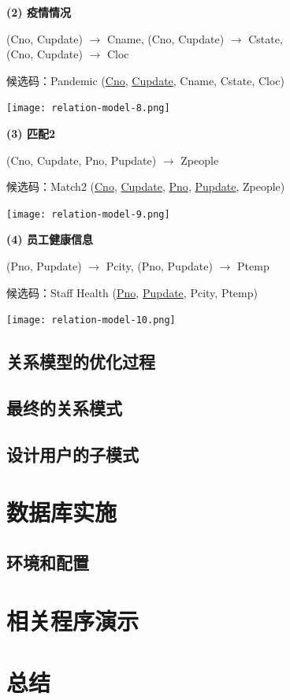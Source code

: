 \documentclass[12pt]{article}
\begin{document}
\noindent \textbf{(2) 疫情情况} \par 
(Cno, Cupdate) $\rightarrow$ Cname, (Cno, Cupdate) $\rightarrow$ Cstate,\\ (Cno, Cupdate) $\rightarrow$ Cloc \par
候选码：Pandemic (\underline{Cno}, \underline{Cupdate}, Cname, Cstate, Cloc)

\begin{center}
	\texttt{[image: relation-model-8.png]}
\end{center}

\noindent \textbf{(3) 匹配2} \par 
(Cno, Cupdate, Pno, Pupdate) $\rightarrow$ Zpeople \par
候选码：Match2 (\underline{Cno}, \underline{Cupdate}, \underline{Pno}, \underline{Pupdate}, Zpeople)

\begin{center}
	\texttt{[image: relation-model-9.png]}
\end{center}

\noindent \textbf{(4) 员工健康信息} \par 
(Pno, Pupdate) $\rightarrow$ Pcity, (Pno, Pupdate) $\rightarrow$ Ptemp \par
候选码：Staff Health (\underline{Pno}, \underline{Pupdate}, Pcity, Ptemp)

\begin{center}
	\texttt{[image: relation-model-10.png]}
\end{center}


\subsection{关系模型的优化过程}

\subsection{最终的关系模式}

\subsection{设计用户的子模式}

\section{数据库实施}

\subsection{环境和配置}

\section{相关程序演示}
\section{总结}
\end{document}
